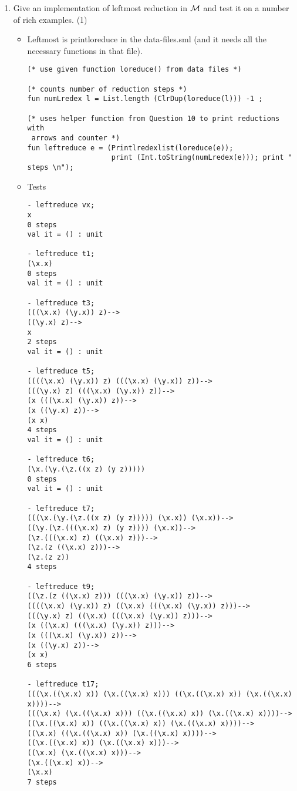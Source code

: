 \documentclass[11pt]{article}
\newcommand \cM {\cal M}
\begin{document}
\begin{enumerate}
\begin{verbatim}
- ereduce t1;
(\x.x)
val it = () : unit

	      \end{verbatim}
	      \color{black}
	      
	\item
	      Give an implementation of leftmost reduction in $\cM$ and test it on a  number of rich examples.
	      \hfill{(1)} %
	      
	      \color{red}
	      \begin{itemize}
	      	\item
	      	      Leftmost is printloreduce in the data-files.sml (and it needs all the necessary functions in that file).  
	      	      \begin{verbatim}
(* use given function loreduce() from data files *)

(* counts number of reduction steps *)
fun numLredex l = List.length (ClrDup(loreduce(l))) -1 ;

(* uses helper function from Question 10 to print reductions with
 arrows and counter *)
fun leftreduce e = (Printlredexlist(loreduce(e)); 
                    print (Int.toString(numLredex(e))); print " steps \n");
	      	      \end{verbatim}
	      	      \item
	      	      Tests
	      	      \begin{verbatim}
- leftreduce vx;
x
0 steps
val it = () : unit

- leftreduce t1;
(\x.x)
0 steps
val it = () : unit

- leftreduce t3;
(((\x.x) (\y.x)) z)-->
((\y.x) z)-->
x
2 steps
val it = () : unit

- leftreduce t5;
((((\x.x) (\y.x)) z) (((\x.x) (\y.x)) z))-->
(((\y.x) z) (((\x.x) (\y.x)) z))-->
(x (((\x.x) (\y.x)) z))-->
(x ((\y.x) z))-->
(x x)
4 steps
val it = () : unit

- leftreduce t6;
(\x.(\y.(\z.((x z) (y z)))))
0 steps
val it = () : unit

- leftreduce t7;
(((\x.(\y.(\z.((x z) (y z))))) (\x.x)) (\x.x))-->
((\y.(\z.(((\x.x) z) (y z)))) (\x.x))-->
(\z.(((\x.x) z) ((\x.x) z)))-->
(\z.(z ((\x.x) z)))-->
(\z.(z z))
4 steps

- leftreduce t9;
((\z.(z ((\x.x) z))) (((\x.x) (\y.x)) z))-->
((((\x.x) (\y.x)) z) ((\x.x) (((\x.x) (\y.x)) z)))-->
(((\y.x) z) ((\x.x) (((\x.x) (\y.x)) z)))-->
(x ((\x.x) (((\x.x) (\y.x)) z)))-->
(x (((\x.x) (\y.x)) z))-->
(x ((\y.x) z))-->
(x x)
6 steps

- leftreduce t17;
(((\x.((\x.x) x)) (\x.((\x.x) x))) ((\x.((\x.x) x)) (\x.((\x.x) x))))-->
(((\x.x) (\x.((\x.x) x))) ((\x.((\x.x) x)) (\x.((\x.x) x))))-->
((\x.((\x.x) x)) ((\x.((\x.x) x)) (\x.((\x.x) x))))-->
((\x.x) ((\x.((\x.x) x)) (\x.((\x.x) x))))-->
((\x.((\x.x) x)) (\x.((\x.x) x)))-->
((\x.x) (\x.((\x.x) x)))-->
(\x.((\x.x) x))-->
(\x.x)
7 steps
	      	      \end{verbatim}
	      	      
	      \end{itemize}
	      \color{black}
\end{enumerate}
\newpage
\end{document}
